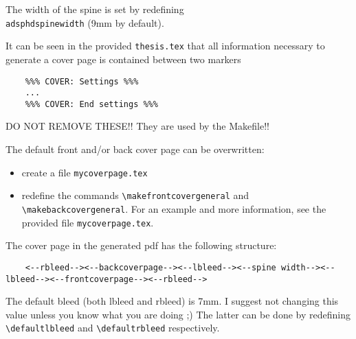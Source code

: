 The width of the spine is set by redefining \texttt{\\adsphdspinewidth} (9mm by default).

It can be seen in the provided \texttt{thesis.tex} that all information necessary to
generate a cover page is contained between two markers

\begin{verbatim}
    %%% COVER: Settings %%%
    ...
    %%% COVER: End settings %%%
\end{verbatim}

DO NOT REMOVE THESE!! They are used by the Makefile!!

The default front and/or back cover page can be overwritten: 

\begin{itemize}
    \item create a file \texttt{mycoverpage.tex}
    \item redefine the commands \texttt{\textbackslash makefrontcovergeneral} and \texttt{\textbackslash makebackcovergeneral}. For
          an example and more information, see the provided file \texttt{mycoverpage.tex}.
\end{itemize}

The cover page in the generated pdf has the following structure:

{\tiny
\begin{verbatim}
    <--rbleed--><--backcoverpage--><--lbleed--><--spine width--><--lbleed--><--frontcoverpage--><--rbleed-->
\end{verbatim}
}

The default bleed (both lbleed and rbleed) is 7mm. I suggest not changing this
value unless you know what you are doing ;) The latter can be done by
redefining \texttt{\textbackslash defaultlbleed} and \texttt{\textbackslash defaultrbleed} respectively.

\cleardoublepage

